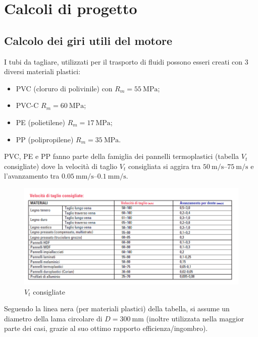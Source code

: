 \documentclass{report}
\begin{document}
\section{Calcoli di progetto}
\subsection{Calcolo dei giri utili del motore}
I tubi da tagliare, utilizzati per il trasporto di fluidi possono esseri creati con 3 diversi materiali plastici:
\begin{itemize}
\item PVC (cloruro di polivinile) con	$R_m = \SI{55}{\MPa}$;
\item PVC-C $R_m = \SI{60}{\MPa}$;
\item PE (polietilene) $R_m = \SI{17}{\MPa}$;
\item PP (polipropilene) $R_m = \SI{35}{\MPa}$.
\end{itemize}
PVC, PE e PP fanno parte della famiglia dei pannelli termoplastici (tabella $V_t$ consigliate) dove la velocità di taglio $V_t$ consigliata si aggira tra $\SIrange{50}{75}{\m\per\s}$ e l’avanzamento tra $\SIrange{0.05}{0.1}{\mm\per\s}$.

\begin{figure}[H]
    \centering
    \includegraphics[width = 1\textwidth]{src/img/Vtaglio_lama.png}
    \caption{$V_t$ consigliate}
    \label{fig:vtcons}
\end{figure}

Seguendo la linea nera (per materiali plastici) della tabella, si assume un diametro della lama circolare di $D=\SI{300}{\mm}$ (inoltre utilizzata nella maggior parte dei casi, grazie al suo ottimo rapporto efficienza/ingombro).
\end{document}

